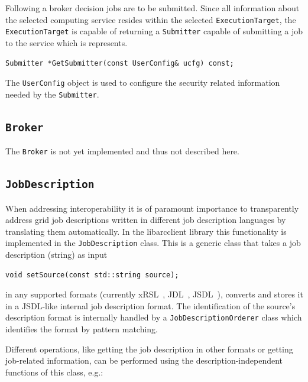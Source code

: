 \documentclass{book}
\newcommand{\arclib}{libarcclient}
\newcommand{\Broker}{\texttt{Broker}}
\newcommand{\ExecutionTarget}{\texttt{ExecutionTarget}}
\newcommand{\JobDescription}{\texttt{JobDescription}}
\newcommand{\Submitter}{\texttt{Submitter}}
\newcommand{\UserConfig}{\texttt{UserConfig}}
\begin{document}
Following a broker decision jobs are to be submitted. Since all
information about the selected computing service resides within the
selected {\ExecutionTarget}, the {\ExecutionTarget} is capable of
returning a {\Submitter} capable of submitting a job to the service
which is represents.

\begin{shaded}
\begin{verbatim}
Submitter *GetSubmitter(const UserConfig& ucfg) const;
\end{verbatim}
\end{shaded}

The {\UserConfig} object is used to configure the security related
information needed by the {\Submitter}.

\subsection{{\Broker}}

The {\Broker} is not yet implemented and thus not described here.

\subsection{{\JobDescription}}

When addressing interoperability it is of paramount importance to
transparently address grid job descriptions written in different job
description languages by translating them automatically. In the
{\arclib} library this functionality is implemented in the
{\JobDescription} class. This is a generic class that takes a job
description (string) as input

\begin{shaded}
\begin{verbatim}
void setSource(const std::string source);
\end{verbatim}
\end{shaded}

in any supported formats (currently xRSL~\cite{xrsl}, JDL~\cite{jdl},
JSDL~\cite{jsdl}), converts and stores it in a JSDL-like internal job
description format. The identification of the source's description
format is internally handled by a \texttt{JobDescriptionOrderer} class
which identifies the format by pattern matching.

Different operations, like getting the job description in other
formats or getting job-related information, can be performed using the
description-independent functions of this class, e.g.:
\end{document}
